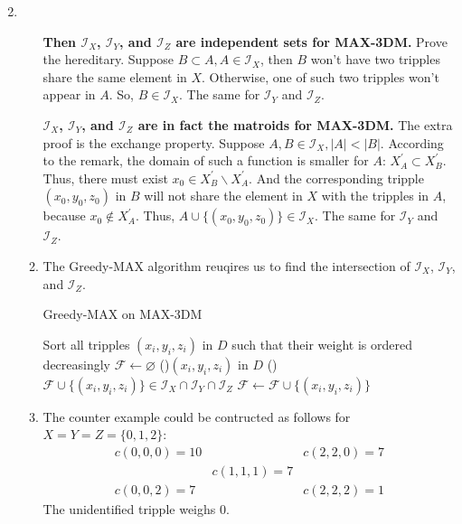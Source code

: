 \documentclass[12pt,a4paper]{article}
\makeatletter
\newtheorem*{solution}{Solution}
\theoremstyle{definition}
\renewenvironment{solution}[1][Solution] {\par\pushQED{\qed}\normalfont\topsep6\p@\@plus6\p@\relax\trivlist\item[\hskip\labelsep\bfseries#1\@addpunct{.}]\ignorespaces}{\popQED\endtrivlist\@endpefalse} \makeatother
\makeatother
\begin{document}
\begin{enumerate}
\begin{solution}
\begin{enumerate}
			\textbf{Then $\mathcal{I}_X$, $\mathcal{I}_Y$, and $\mathcal{I}_Z$ are independent sets for MAX-3DM.} Prove the hereditary. Suppose $B\subset A, A\in \mathcal{I}_X$, then $B$ won't have two tripples share the same element in $X$. Otherwise, one of such two tripples won't appear in $A$. So, $B\in \mathcal{I}_X$. The same for $\mathcal{I}_Y$ and $\mathcal{I}_Z$.

			\textbf{$\mathcal{I}_X$, $\mathcal{I}_Y$, and $\mathcal{I}_Z$ are in fact the matroids for MAX-3DM.} The extra proof is the exchange property. Suppose $A,B\in \mathcal{I}_X, |A|<|B|$. According to the remark, the domain of such a function is smaller for $A$: $X^\prime_A\subset X^\prime_B$. Thus, there must exist $x_0\in X^\prime_B\backslash X^\prime_A$. And the corresponding tripple $(x_0,y_0,z_0)$ in $B$ will not share the element in $X$ with the tripples in $A$, because $x_0\not\in X^\prime_A$. Thus, $A\cup\{(x_0,y_0,z_0)\}\in \mathcal{I}_X$. The same for $\mathcal{I}_Y$ and $\mathcal{I}_Z$.
			\item The Greedy-MAX algorithm reuqires us to find the intersection of $\mathcal{I}_X$, $\mathcal{I}_Y$, and $\mathcal{I}_Z$.
			\begin{minipage}{0.88\textwidth}
				\begin{algorithm}[H]
				\caption{Greedy-MAX on MAX-3DM}
				\BlankLine
				Sort all tripples $(x_i,y_i,z_i)$ in $D$ such that their weight is ordered decreasingly\;
				$\mathcal{F}\leftarrow\varnothing$\;
				\ForEach(){$(x_i,y_i,z_i)$ in $D$}{
					\If(){$\mathcal{F}\cup\{(x_i,y_i,z_i)\}\in\mathcal{I}_X\cap\mathcal{I}_Y\cap\mathcal{I}_Z$}{
						$\mathcal{F}\leftarrow \mathcal{F}\cup\{(x_i,y_i,z_i)\}$\;
					}
				}
				\;
				\end{algorithm}
			\end{minipage}
			\item The counter example could be contructed as follows for $X=Y=Z=\{0,1,2\}$:
			\begin{equation*}
				\begin{array}{ccc}
				c(0,0,0)=10 & 			 & c(2,2,0)=7 \\
							& c(1,1,1)=7 &			  \\
				c(0,0,2)=7	&			 & c(2,2,2)=1
				\end{array}
			\end{equation*}
			The unidentified tripple weighs 0. 
			

\end{enumerate}
\end{solution}
\end{enumerate}
\end{document}
